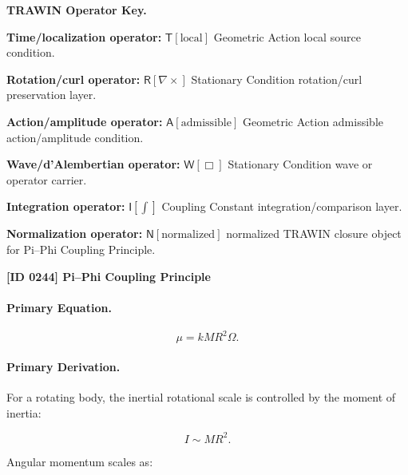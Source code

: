 \par\vspace{0.45\baselineskip}
\noindent\begin{minipage}[t]{\linewidth}
\begingroup
\small
\raggedright
\textbf{TRAWIN Operator Key.}\par
\noindent\textbf{Time/localization operator:} $\mathsf{T}\!\left[\mathrm{local}\right]$ Geometric Action local source condition.\par
\noindent\textbf{Rotation/curl operator:} $\mathsf{R}\!\left[\nabla\times\right]$ Stationary Condition rotation/curl preservation layer.\par
\noindent\textbf{Action/amplitude operator:} $\mathsf{A}\!\left[\mathrm{admissible}\right]$ Geometric Action admissible action/amplitude condition.\par
\noindent\textbf{Wave/d'Alembertian operator:} $\mathsf{W}\!\left[\Box\right]$ Stationary Condition wave or operator carrier.\par
\noindent\textbf{Integration operator:} $\mathsf{I}\!\left[\int\right]$ Coupling Constant integration/comparison layer.\par
\noindent\textbf{Normalization operator:} $\mathsf{N}\!\left[\mathrm{normalized}\right]$ normalized TRAWIN closure object for Pi--Phi Coupling Principle.\par
\endgroup
\end{minipage}

\clearpage
\noindent\textbf{[ID 0244] Pi--Phi Coupling Principle}\par
\vspace{0.35em}
\paragraph{Primary Equation.}
\begin{equation}
\mu
=
kMR^2\Omega .
\end{equation}

\paragraph{Primary Derivation.}
For a rotating body, the inertial rotational scale is controlled by the moment of inertia:

\begin{equation}
I
\sim
MR^2 .
\end{equation}

Angular momentum scales as:

